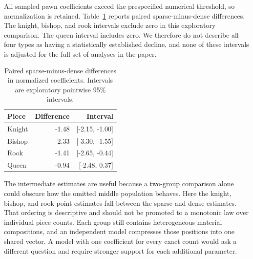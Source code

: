 \documentclass{jcst}
\begin{document}
All sampled pawn coefficients exceed the prespecified numerical threshold, so normalization is retained. Table~\ref{tab:countcontrast} reports paired sparse-minus-dense differences. The knight, bishop, and rook intervals exclude zero in this exploratory comparison. The queen interval includes zero. We therefore do not describe all four types as having a statistically established decline, and none of these intervals is adjusted for the full set of analyses in the paper.
\begin{table}[tbp]\centering
\small
\caption{Paired sparse-minus-dense differences in normalized coefficients. Intervals are exploratory pointwise 95\% intervals.}\label{tab:countcontrast}
\begin{tabular}{lrr}
\toprule
Piece & Difference & Interval\\\midrule
Knight & -1.48 & [-2.15, -1.00]\\
Bishop & -2.33 & [-3.30, -1.55]\\
Rook & -1.41 & [-2.65, -0.44]\\
Queen & -0.94 & [-2.48, 0.37]\\
\bottomrule\end{tabular}\end{table}

The intermediate estimates are useful because a two-group comparison alone could obscure how the omitted middle population behaves. Here the knight, bishop, and rook point estimates fall between the sparse and dense estimates. That ordering is descriptive and should not be promoted to a monotonic law over individual piece counts. Each group still contains heterogeneous material compositions, and an independent model compresses those positions into one shared vector. A model with one coefficient for every exact count would ask a different question and require stronger support for each additional parameter.
\end{document}
